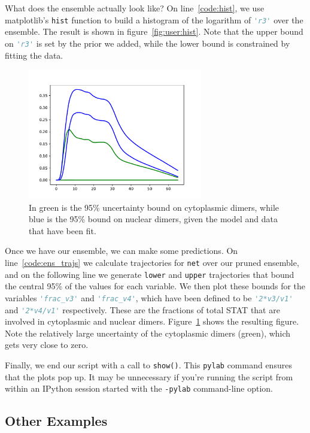 \documentclass[12pt]{article}
\makeatletter
\newcommand{\py}[1]{\lstinline[language=Python, showstringspaces=False]@#1@}
\newcommand{\shell}[1]{\lstinline[language=csh, showstringspaces=False]!#1!}
\makeatother
\begin{document}
What does the ensemble actually look like?
On line~\ref{code:hist}, we use matplotlib's \py{hist} function to build a histogram of the logarithm of \py{'r3'} over the ensemble.
The result is shown in figure~\ref{fig:user:hist}.
Note that the upper bound on \py{'r3'} is set by the prior we added, while the lower bound is constrained by fitting the data.

\begin{figure}
\begin{center}
\includegraphics[width=3in]{../../Example/JAK-STAT/uncerts}
\end{center}
\caption[Prediction uncertainties for the JAK-STAT model]{In green is the 95\% uncertainty bound on cytoplasmic dimers, while blue is the 95\% bound on nuclear dimers, given the model and data that have been fit.\label{fig:user:uncerts}}
\end{figure}

Once we have our ensemble, we can make some predictions.
On line~\ref{code:ens_trajs} we calculate trajectories for \py{net} over our pruned ensemble, and on the following line we generate \py{lower} and \py{upper} trajectories that bound the central 95\% of the values for each variable.
We then plot these bounds for the variables \py{'frac_v3'} and \py{'frac_v4'}, which have been defined to be \py{'2*v3/v1'} and \py{'2*v4/v1'} respectively. These are the fractions of total STAT that are involved in cytoplasmic and nuclear dimers.
Figure~\ref{fig:user:uncerts} shows the resulting figure.
Note the relatively large uncertainty of the cytoplasmic dimers (green), which gets very close to zero.

Finally, we end our script with a call to \py{show()}. This \py{pylab} command ensures that the plots pop up. It may be unnecessary if you're running the script from within an IPython session started with the \shell{-pylab} command-line option.

\subsection{Other Examples}
\end{document}
